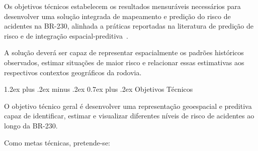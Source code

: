 \documentclass[11pt,a4paper]{article}
\makeatletter
\renewcommand\subsection{
\@startsection{subsection}{2}{0pt}%
{1.2ex plus .2ex minus .2ex}%
{0.7ex plus .2ex}%
{\normalfont\large\bfseries}
}
\makeatother
\begin{document}
Os objetivos técnicos estabelecem os resultados mensuráveis necessários para desenvolver uma solução integrada de mapeamento e predição do risco de acidentes na BR-230, alinhada a práticas reportadas na literatura de predição de risco e de integração espacial-preditiva~\cite{behboudi2024,khan2024}.

A solução deverá ser capaz de representar espacialmente os padrões históricos observados, estimar situações de maior risco e relacionar essas estimativas aos respectivos contextos geográficos da rodovia.

\subsection{Objetivos Técnicos}

O objetivo técnico geral é desenvolver uma representação geoespacial e preditiva capaz de identificar, estimar e visualizar diferentes níveis de risco de acidentes ao longo da BR-230.

Como metas técnicas, pretende-se:
\end{document}
